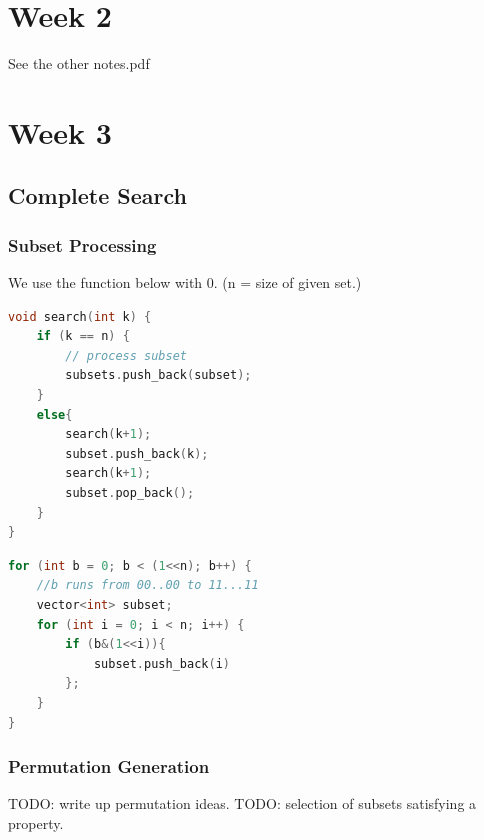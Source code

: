 \documentclass{report}
\begin{document}
\chapter{Week 2}
See the other notes.pdf
\chapter{Week 3}
\section{Complete Search}
\subsection*{Subset Processing}
We use the function below with 0. (n = size of given set.)
\begin{lstlisting}[language=C++,caption=Subset Generation]
void search(int k) {
    if (k == n) {
        // process subset
        subsets.push_back(subset);
    }
    else{
        search(k+1);
        subset.push_back(k);
        search(k+1);
        subset.pop_back();
    }
}
\end{lstlisting}
\begin{lstlisting}[language=C++]
for (int b = 0; b < (1<<n); b++) {
    //b runs from 00..00 to 11...11
    vector<int> subset;
    for (int i = 0; i < n; i++) {
        if (b&(1<<i)){
            subset.push_back(i)
        };
    }
}
\end{lstlisting}
\subsection*{Permutation Generation}
TODO: write up permutation ideas.
TODO: selection of subsets satisfying a property.
\end{document}
